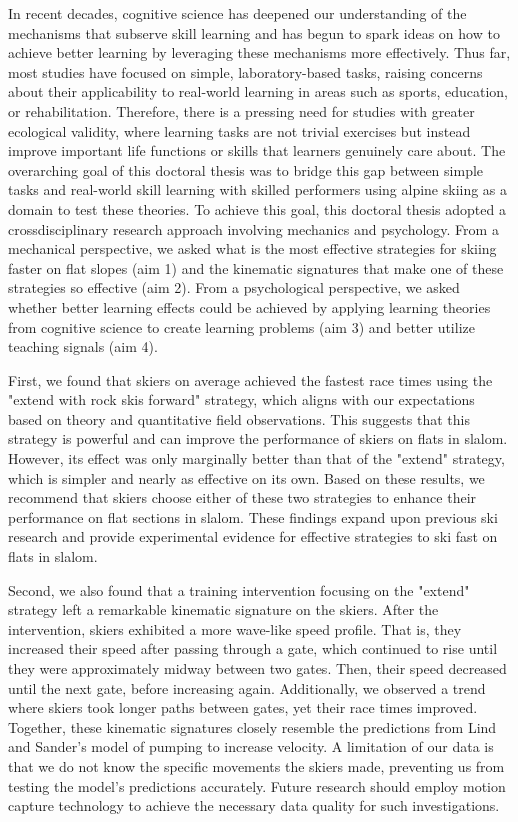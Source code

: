 In recent decades, cognitive science has deepened our understanding of the mechanisms that subserve skill learning and has begun to spark ideas on how to achieve better learning by leveraging these mechanisms more effectively. Thus far, most studies have focused on simple, laboratory-based tasks, raising concerns about their applicability to real-world learning in areas such as sports, education, or rehabilitation. Therefore, there is a pressing need for studies with greater ecological validity, where learning tasks are not trivial exercises but instead improve important life functions or skills that learners genuinely care about. The overarching goal of this doctoral thesis was to bridge this gap between simple tasks and real-world skill learning with skilled performers using alpine skiing as a domain to test these theories. To achieve this goal, this doctoral thesis adopted a crossdisciplinary research approach involving mechanics and psychology. From a mechanical perspective, we asked what is the most effective strategies for skiing faster on flat slopes (aim 1) and the kinematic signatures that make one of these strategies so effective (aim 2). From a psychological perspective, we asked whether better learning effects could be achieved by applying learning theories from cognitive science to create learning problems (aim 3) and better utilize teaching signals (aim 4).  

First, we found that skiers on average achieved the fastest race times using the "extend with rock skis forward" strategy, which aligns with our expectations based on theory and quantitative field observations. This suggests that this strategy is powerful and can improve the performance of skiers on flats in slalom. However, its effect was only marginally better than that of the "extend" strategy, which is simpler and nearly as effective on its own. Based on these results, we recommend that skiers choose either of these two strategies to enhance their performance on flat sections in slalom. These findings expand upon previous ski research and provide experimental evidence for effective strategies to ski fast on flats in slalom.

Second, we also found that a training intervention focusing on the "extend" strategy left a remarkable kinematic signature on the skiers. After the intervention, skiers exhibited a more wave-like speed profile. That is, they increased their speed after passing through a gate, which continued to rise until they were approximately midway between two gates. Then, their speed decreased until the next gate, before increasing again. Additionally, we observed a trend where skiers took longer paths between gates, yet their race times improved. Together, these kinematic signatures closely resemble the predictions from Lind and Sander's model of pumping to increase velocity. A limitation of our data is that we do not know the specific movements the skiers made, preventing us from testing the model's predictions accurately. Future research should employ motion capture technology to achieve the necessary data quality for such investigations.

